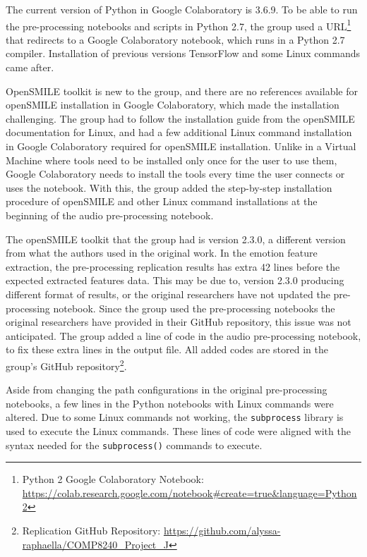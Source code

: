 \documentclass{article}
\newenvironment{subs}
  {\adjustwidth{3em}{0pt}}
  {\endadjustwidth}
\begin{document}
\begin{subs}
    The current version of Python in Google Colaboratory is 3.6.9. To be able to run the pre-processing notebooks and scripts in Python 2.7, the group used a URL\footnote{Python 2 Google Colaboratory Notebook:\\ \url{https://colab.research.google.com/notebook\#create=true&language=Python2}} that redirects to a Google Colaboratory notebook, which runs in a Python 2.7 compiler. Installation of previous versions TensorFlow and some Linux commands came after.\par
    
    OpenSMILE toolkit is new to the group, and there are no references available for openSMILE installation in Google Colaboratory, which made the installation challenging. The group had to follow the installation guide from the openSMILE documentation for Linux, and had a few additional Linux command installation in Google Colaboratory required for openSMILE installation. Unlike in a Virtual Machine where tools need to be installed only once for the user to use them, Google Colaboratory needs to install the tools every time the user connects or uses the notebook. With this, the group added the step-by-step installation procedure of openSMILE and other Linux command installations at the beginning of the audio pre-processing notebook.\par
    
    The openSMILE toolkit that the group had is version 2.3.0, a different version from what the authors used in the original work. In the emotion feature extraction, the pre-processing replication results has extra 42 lines before the expected extracted features data. This may be due to, version 2.3.0 producing different format of results, or the original researchers have not updated the pre-processing notebook. Since the group used the pre-processing notebooks the original researchers have provided in their GitHub repository, this issue was not anticipated. The group added a line of code in the audio pre-processing notebook, to fix these extra lines in the output file. All added codes are stored in the group's GitHub repository\footnote{Replication GitHub Repository:  \url{https://github.com/alyssa-raphaella/COMP8240_Project_J}}.\par
    
    Aside from changing the path configurations in the original pre-processing notebooks, a few lines in the Python notebooks with Linux commands were altered. Due to some Linux commands not working, the \verb|subprocess| library is used to execute the Linux commands. These lines of code were aligned with the syntax needed for the \verb|subprocess()| commands to execute.\par
    

\end{subs}
\end{document}
